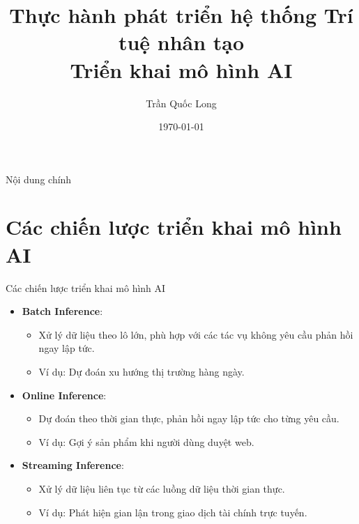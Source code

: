 \documentclass{beamer}
\title{Thực hành phát triển hệ thống Trí tuệ nhân tạo\\
Triển khai mô hình AI
}
\author{Trần Quốc Long}
\institute{Trường ĐH Công nghệ, ĐHQG Hà Nội}
\date{\today}
\begin{document}
\frame{\titlepage}

\begin{frame}{Nội dung chính}
    \tableofcontents
\end{frame}

\section{Các chiến lược triển khai mô hình AI}

\begin{frame}{Các chiến lược triển khai mô hình AI}
    \begin{itemize}
        \item \textbf{Batch Inference}:
        \begin{itemize}
            \item Xử lý dữ liệu theo lô lớn, phù hợp với các tác vụ không yêu cầu phản hồi ngay lập tức.
            \item Ví dụ: Dự đoán xu hướng thị trường hàng ngày.
        \end{itemize}
        \item \textbf{Online Inference}:
        \begin{itemize}
            \item Dự đoán theo thời gian thực, phản hồi ngay lập tức cho từng yêu cầu.
            \item Ví dụ: Gợi ý sản phẩm khi người dùng duyệt web.
        \end{itemize}
        \item \textbf{Streaming Inference}:
        \begin{itemize}
            \item Xử lý dữ liệu liên tục từ các luồng dữ liệu thời gian thực.
            \item Ví dụ: Phát hiện gian lận trong giao dịch tài chính trực tuyến.
        \end{itemize}
    \end{itemize}
\end{frame}
\end{document}
